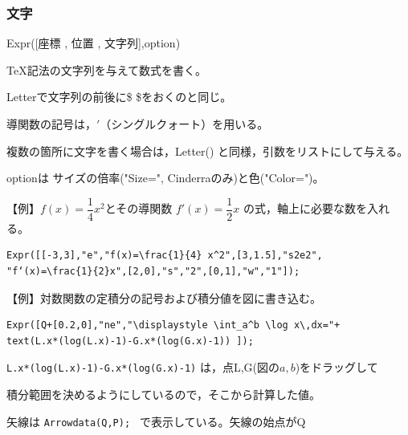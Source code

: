 \documentclass[papersize,a4paper,12pt,uplatex]{jsarticle}
\begin{document}
\subsubsection{文字}
\begin{description}

\vspace{\baselineskip}
\hypertarget{expr}{}
\item[関数]Expr([座標 , 位置 , 文字列],option)
\item[機能]\TeX 記法の文字列を与えて数式を書く。
\item[説明]Letterで文字列の前後に\$ \$をおくのと同じ。

導関数の記号は，$'$（シングルクォート）を用いる。

複数の箇所に文字を書く場合は，Letter() と同様，引数をリストにして与える。

optionは サイズの倍率("Size=", Cinderraのみ)と色("Color=")。

\vspace{\baselineskip}
【例】$f(x)=\dfrac{1}{4} x^2$とその導関数 $f'(x)=\dfrac{1}{2} x$ の式，軸上に必要な数を入れる。
\begin{verbatim}
Expr([[-3,3],"e","f(x)=\frac{1}{4} x^2",[3,1.5],"s2e2",
"f‘(x)=\frac{1}{2}x",[2,0],"s","2",[0,1],"w","1"]);
\end{verbatim}
\vspace{\baselineskip}
\begin{center} \end{center}

【例】対数関数の定積分の記号および積分値を図に書き込む。
\begin{verbatim}
Expr([Q+[0.2,0],"ne","\displaystyle \int_a^b \log x\,dx="+
text(L.x*(log(L.x)-1)-G.x*(log(G.x)-1)) ]);
\end{verbatim}

 \verb|L.x*(log(L.x)-1)-G.x*(log(G.x)-1)| は，点L,G(図の$a,b$)をドラッグして
 
 積分範囲を決めるようにしているので，そこから計算した値。
 
 矢線は \verb|Arrowdata(Q,P); | で表示している。矢線の始点がQ
\vspace{\baselineskip}
\begin{center} \end{center}



\end{description}
\end{document}
